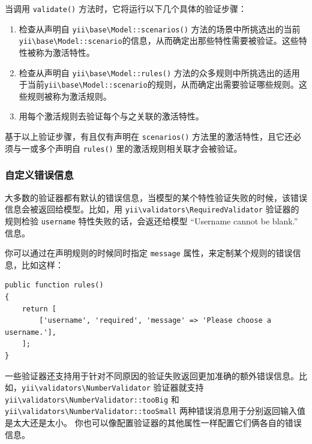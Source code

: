 当调用 \lstinline|validate()| 方法时，它将运行以下几个具体的验证步骤：

\begin{enumerate}
\item 检查从声明自 \texttt{yii{\allowbreak{}\textbackslash}base{\allowbreak{}\textbackslash}Model\allowbreak{}::\allowbreak{}scenarios()} 方法的场景中所挑选出的当前\texttt{yii{\allowbreak{}\textbackslash}base{\allowbreak{}\textbackslash}Model\allowbreak{}::\allowbreak{}scenario}的信息，从而确定出那些特性需要被验证。这些特性被称为激活特性。
\item 检查从声明自 \texttt{yii{\allowbreak{}\textbackslash}base{\allowbreak{}\textbackslash}Model\allowbreak{}::\allowbreak{}rules()} 方法的众多规则中所挑选出的适用于当前\texttt{yii{\allowbreak{}\textbackslash}base{\allowbreak{}\textbackslash}Model\allowbreak{}::\allowbreak{}scenario}的规则，从而确定出需要验证哪些规则。这些规则被称为激活规则。
\item 用每个激活规则去验证每个与之关联的激活特性。
\end{enumerate}
基于以上验证步骤，有且仅有声明在 \lstinline|scenarios()| 方法里的激活特性，且它还必须与一或多个声明自 \lstinline|rules()| 里的激活规则相关联才会被验证。

\subsubsection{自定义错误信息 \label{input-validation.md::customizing-error-messages}}
大多数的验证器都有默认的错误信息，当模型的某个特性验证失败的时候，该错误信息会被返回给模型。比如，用 \texttt{yii{\allowbreak{}\textbackslash}validators{\allowbreak{}\textbackslash}RequiredValidator} 验证器的规则检验 \lstinline|username| 特性失败的话，会返还给模型 ``Username cannot be blank.'' 信息。

你可以通过在声明规则的时候同时指定 \lstinline|message| 属性，来定制某个规则的错误信息，比如这样：

\lstset{language=php}\begin{lstlisting}
public function rules()
{
    return [
        ['username', 'required', 'message' => 'Please choose a username.'],
    ];
}
\end{lstlisting}
一些验证器还支持用于针对不同原因的验证失败返回更加准确的额外错误信息。比如，\texttt{yii{\allowbreak{}\textbackslash}validators{\allowbreak{}\textbackslash}NumberValidator} 验证器就支持 \texttt{yii{\allowbreak{}\textbackslash}validators{\allowbreak{}\textbackslash}NumberValidator\allowbreak{}::\allowbreak{}tooBig} 和 \texttt{yii{\allowbreak{}\textbackslash}validators{\allowbreak{}\textbackslash}NumberValidator\allowbreak{}::\allowbreak{}tooSmall} 两种错误消息用于分别返回输入值是太大还是太小。
你也可以像配置验证器的其他属性一样配置它们俩各自的错误信息。

